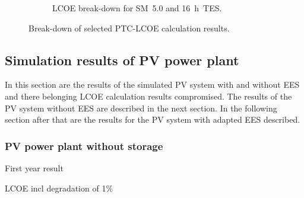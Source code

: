 \begin{figure}[!htbp]
\begin{subfigure}[b]{0.5\textwidth}
                \caption{LCOE break-down for SM~5.0 and 16~h~TES.}\label{PTC_LCOE_highinvest_BreakDown}
        \end{subfigure}
        \caption[Break-down of selected PTC-LCOE calculation results.]{Break-down of selected PTC-LCOE calculation results.}\label{PTC_LCOE_BreakDown}
\end{figure}
\pagebreak
\subsection{Simulation results of PV power plant}
In this section are the results of the simulated PV system with and without EES and there belonging LCOE calculation results compromised. The results of the PV system without EES are described in the next section. In the following section after that are the results for the PV system with adapted EES described.  
\subsubsection{PV power plant without storage}

First year result 

LCOE incl degradation of 1\%

